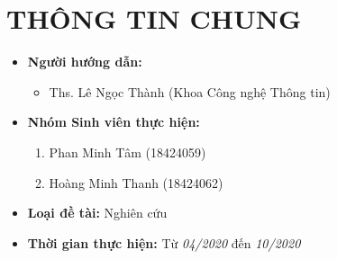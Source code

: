 \documentclass{article}[14pt]
\begin{document}
    \vspace{.5cm}
    
    \Large
    \section{THÔNG TIN CHUNG}
    \begin{itemize}[label = {}]
        
        \item \textbf{Người hướng dẫn:} 
        \begin{itemize}
            \item Ths. Lê Ngọc Thành (Khoa Công nghệ Thông tin)
        \end{itemize}{}
    
        
        \item \textbf{Nhóm Sinh viên thực hiện:}
        
        \begin{enumerate}
        
            \item Phan Minh Tâm (18424059)
            \item Hoàng Minh Thanh (18424062)
        \end{enumerate}

        \item \textbf{Loại đề tài:} Nghiên cứu
        
        \item \textbf{Thời gian thực hiện:} Từ \textit{04/2020} đến \textit{10/2020}
        
        
    \end{itemize}
    
\end{document}
